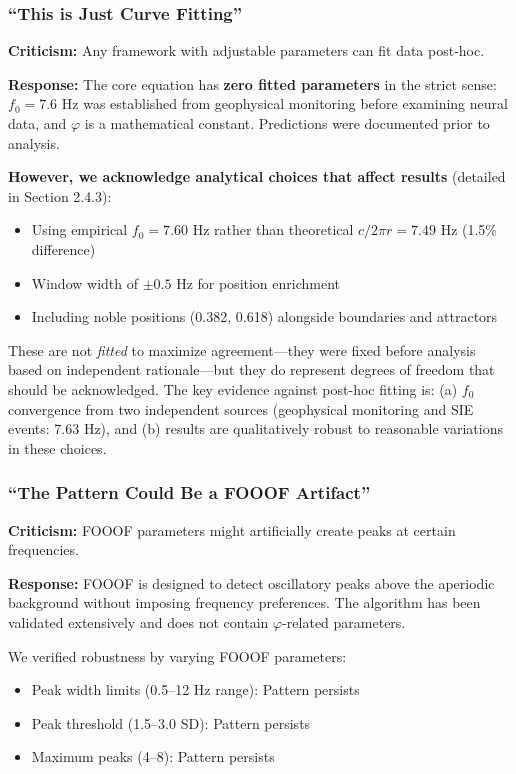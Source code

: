 \documentclass[11pt,a4paper]{article}
\newcommand{\phisym}{\varphi}
\newcommand{\fzero}{f_0}
\begin{document}
\subsubsection{``This is Just Curve Fitting''}

\textbf{Criticism:} Any framework with adjustable parameters can fit data post-hoc.

\textbf{Response:} The core equation has \textbf{zero fitted parameters} in the strict sense: $\fzero = 7.6$ Hz was established from geophysical monitoring before examining neural data, and $\phisym$ is a mathematical constant. Predictions were documented prior to analysis.

\textbf{However, we acknowledge analytical choices that affect results} (detailed in Section 2.4.3):
\begin{itemize}
    \item Using empirical $\fzero = 7.60$ Hz rather than theoretical $c/2\pi r = 7.49$ Hz (1.5\% difference)
    \item Window width of $\pm 0.5$ Hz for position enrichment
    \item Including noble positions (0.382, 0.618) alongside boundaries and attractors
\end{itemize}

These are not \textit{fitted} to maximize agreement---they were fixed before analysis based on independent rationale---but they do represent degrees of freedom that should be acknowledged. The key evidence against post-hoc fitting is: (a) $\fzero$ convergence from two independent sources (geophysical monitoring and SIE events: 7.63 Hz), and (b) results are qualitatively robust to reasonable variations in these choices.

\subsubsection{``The Pattern Could Be a FOOOF Artifact''}

\textbf{Criticism:} FOOOF parameters might artificially create peaks at certain frequencies.

\textbf{Response:} FOOOF is designed to detect oscillatory peaks above the aperiodic background without imposing frequency preferences. The algorithm has been validated extensively \citep{donoghue2020} and does not contain $\phisym$-related parameters.

We verified robustness by varying FOOOF parameters:
\begin{itemize}
    \item Peak width limits (0.5--12 Hz range): Pattern persists
    \item Peak threshold (1.5--3.0 SD): Pattern persists
    \item Maximum peaks (4--8): Pattern persists
\end{itemize}
\end{document}
